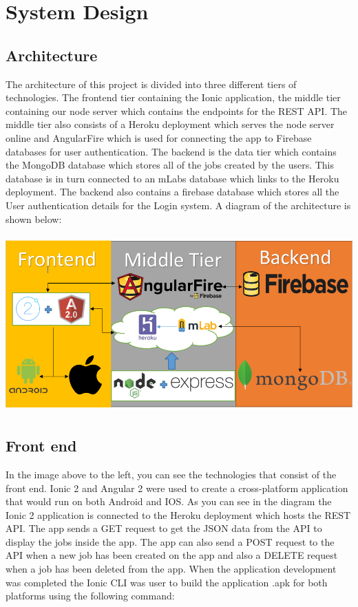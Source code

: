 \chapter{System Design}
 \section{Architecture}

The architecture of this project is divided into three different tiers of technologies. The frontend tier containing the Ionic application, the middle tier containing our node server which contains the endpoints for the REST API. The middle tier also consists of a Heroku deployment which serves the node server online and AngularFire which is used for connecting the app to Firebase databases for user authentication. The backend is the data tier which contains the MongoDB database which stores all of the jobs created by the users. This database is in turn connected to an mLabs database which links to the Heroku deployment. The backend also contains a firebase database which stores all the User authentication details for the Login system. A diagram of the architecture is shown below:


\begin{center}    
	\includegraphics[width=15cm, height=6.8cm]{img/system.png}
\end{center}

\section{Front end}
In the image above to the left, you can see the technologies that consist of the front end. Ionic 2 and  Angular 2 were used to create a cross-platform application that would run on both Android and IOS. As you can see in the diagram the Ionic 2 application is connected to the Heroku deployment which hosts the REST API. The app sends a GET request to get the JSON data from the API to display the jobs inside the app. The app can also send a POST request to the API when a new job has been created on the app and also a DELETE request when a job has been deleted from the app. When the application development was completed the Ionic CLI was user to build the application .apk for both platforms using the following command:


